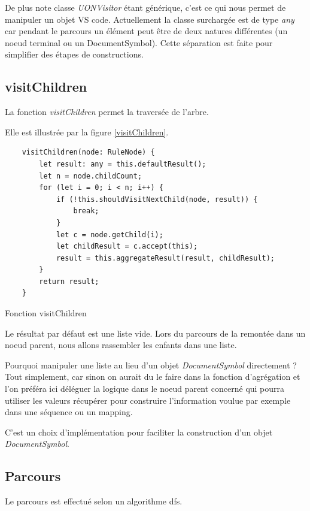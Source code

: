 \documentclass[
    iict, %
    il, %
]{heig-tb}
\begin{document}
De plus note classe \emph{UONVisitor} étant générique, c'est ce qui nous permet de manipuler un objet VS code.
Actuellement la classe surchargée est de type \emph{any} car pendant le parcours un élément peut être de deux natures différentes (un noeud terminal ou un DocumentSymbol).
Cette séparation est faite pour simplifier des étapes de constructions.

\subsection{visitChildren}
La fonction \emph{visitChildren} permet la traversée de l'arbre.

Elle est illustrée par la figure \ref{visitChildren}.

\begin{listing}[!ht]
    \begin{verbatim}
    visitChildren(node: RuleNode) {
        let result: any = this.defaultResult();
        let n = node.childCount;
        for (let i = 0; i < n; i++) {
            if (!this.shouldVisitNextChild(node, result)) {
                break;
            }
            let c = node.getChild(i);
            let childResult = c.accept(this);
            result = this.aggregateResult(result, childResult);
        }
        return result;
    }
    \end{verbatim}
    \caption{Fonction visitChildren }
    \label{visitChildren}
\end{listing}

Le résultat par défaut est une liste vide. Lors du parcours de la remontée dans un noeud parent, nous allons rassembler les enfants dans une liste.

Pourquoi manipuler une liste au lieu d'un objet \emph{DocumentSymbol} directement ?
Tout simplement, car sinon on aurait du le faire dans la fonction d'agrégation et l'on préféra ici déléguer la logique dans le noeud parent concerné
qui pourra utiliser les valeurs récupérer pour construire l'information voulue par exemple dans une séquence ou un mapping.

C'est un choix d'implémentation pour faciliter la construction d'un objet \emph{DocumentSymbol}.

\subsection{Parcours}

Le parcours est effectué selon un algorithme \Gls{dfs}.
\end{document}
